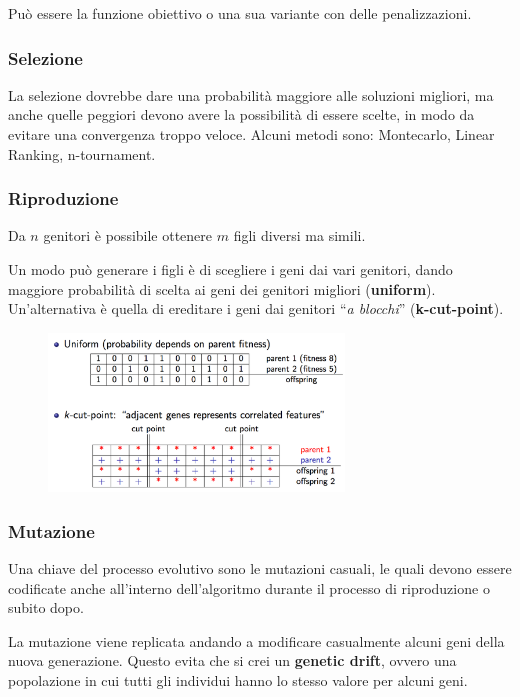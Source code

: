 Può essere la funzione obiettivo o una sua variante con delle penalizzazioni.

\subsubsection{Selezione}

La selezione dovrebbe dare una probabilità maggiore alle soluzioni migliori, ma anche quelle peggiori devono avere la possibilità di essere scelte, in modo da evitare una convergenza troppo veloce.
Alcuni metodi sono: Montecarlo, Linear Ranking, n-tournament.

\subsubsection{Riproduzione}

Da $n$ genitori è possibile ottenere $m$ figli diversi ma simili.

Un modo può generare i figli è di scegliere i geni dai vari genitori, dando maggiore probabilità di scelta ai geni dei genitori migliori (\textbf{uniform}).
Un'alternativa è quella di ereditare i geni dai genitori ``\textit{a blocchi}'' (\textbf{k-cut-point}).

\begin{figure}[htbp]
	\centering
	\includegraphics[width=0.7\textwidth]{images/l8-fig-1.png}
\end{figure}

\subsubsection{Mutazione}

Una chiave del processo evolutivo sono le mutazioni casuali, le quali devono essere codificate anche all'interno dell'algoritmo durante il processo di riproduzione o subito dopo.

La mutazione viene replicata andando a modificare casualmente alcuni geni della nuova generazione.
Questo evita che si crei un \textbf{genetic drift}, ovvero una popolazione in cui tutti gli individui hanno lo stesso valore per alcuni geni.

